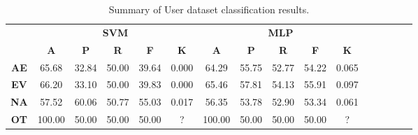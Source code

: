 \begin{landscape}
\begin{table}[htbp]
\footnotesize
\centering
\caption{Summary of User dataset classification results.}
\label{tab:base_female}
\begin{tabular}{|c|c|c|c|c|c|c|c|c|c|c|c|c|c|c|c|}
\hline
\multirow{2}{*}{}	& \multicolumn{5}{c|}{\textbf{SVM}}												& \multicolumn{5}{c|}{\textbf{MLP}}												\\ \cline{2-11} 
					& \textbf{A}	& \textbf{P}	& \textbf{R}	& \textbf{F}	& \textbf{K}	& \textbf{A}	& \textbf{P}	& \textbf{R}	& \textbf{F}	& \textbf{K}	\\ \hline
\textbf{AE}			& 65.68			& 32.84			& 50.00			& 39.64			& 0.000			& 64.29			& 55.75			& 52.77			& 54.22			& 0.065			\\ \hline
\textbf{EV}			& 66.20			& 33.10			& 50.00			& 39.83			& 0.000			& 65.46			& 57.81			& 54.13			& 55.91			& 0.097			\\ \hline
\textbf{NA}			& 57.52			& 60.06			& 50.77			& 55.03			& 0.017			& 56.35			& 53.78			& 52.90			& 53.34			& 0.061			\\ \hline
\textbf{OT}			& 100.00			& 50.00			& 50.00			& 50.00			& ?			& 100.00			& 50.00			& 50.00			& 50.00			& ?			\\ \hline
\end{tabular}
\end{table}
\end{landscape}